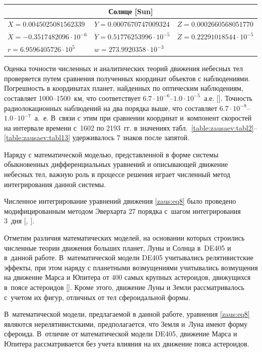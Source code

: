\begin{table}[p]
\begin{minipage}[t]{132mm}
\begin{tabular}{lll}
\multicolumn{3}{c}{	Солнце		[Sun]			}	\\ \hline
$X=	0.0045025081562339	$	&	$Y=	0.0007670747009324	$	&	$Z=	0.0002660568051770	$	\\
$\dot{X}=	-0.3517482096\cdot  10^{-6}	$	&	$\dot{Y}=	0.51776253996 \cdot  10^{-5}	$	&	$\dot{Z}=	 0.22291018544\cdot  10^{-5}	$	\\
$r=	6.9596405726 \cdot 10^5	$	&	$w = 273.9920358\cdot  10^{-3}	$	&				\\ \hline
\end{tabular}
\label{table:zausaev:tabl1}
\end{minipage}
\end{table}



Оценка точности численных и аналитических теорий движения небесных тел проверяется путем сравнения полученных координат объектов с наблюдениями. Погрешность в  координатах планет, найденных по оптическим наблюдениям, составляет 1000--1500~км, что соответствует $6.7 \cdot 10^{-6}$--$1.0 \cdot 10^{-5}$~а.е. []. 
Точность радиолокационных наблюдений на два порядка выше, что составляет $6.7 \cdot 10^{-8}$--$1.0 \cdot 10^{-7}$~а.~е. 
В~связи с этим при сравнении координат и~компонент скоростей на интервале времени с~1602 по 2193~гг. в значениях табл.~\ref{table:zausaev:tabl2}--\ref{table:zausaev:tabl13} удерживалось 7 знаков после запятой.

Наряду с математической моделью, представленной в форме системы обыкновенных дифференциальных уравнений и описывающей движение небесных тел, важную роль в процессе решения играет численный метод интегрирования данной системы.

Численное интегрирование уравнений движения \eqref{zaus:eq8}  было проведено модифицированным методом Эверхарта 27 порядка с~шагом интегрирования 3~дня [, ].

Отметим различия математических моделей, на основании которых строились численные теории движения больших планет, Луны и Солнца в~DE405 и в~данной работе. 
В~математической модели DE405 учитывались релятивистские эффекты, при этом наряду с планетными возмущениями учитывались возмущения на движение Марса и Юпитера от 400 самых крупных астероидов, движущихся в~поясе астероидов []. 
Кроме этого, движение Луны и Земли рассматривалось с~учетом их фигур, отличных от тел сфероидальной формы.

В~математической модели, предлагаемой в данной работе, уравнения \eqref{zaus:eq8} являются нерелятивистскими, предполагается, что Земля и~Луна имеют форму сфероида. 
В~отличие от математической модели DE405, движение Марса и Юпитера рассматривается без учета влияния на их движение пояса астероидов.

